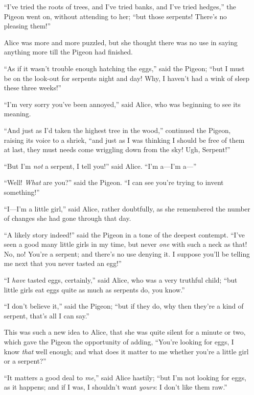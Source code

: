 \documentclass[11pt,openany,oneside]{book}
\begin{document}
“I’ve tried the roots of trees, and I’ve tried banks, and I’ve tried hedges,” the Pigeon went on, without attending to her; “but those serpents! There’s no pleasing them!” 

Alice was more and more puzzled, but she thought there was no use in saying anything more till the Pigeon had finished. 

“As if it wasn’t trouble enough hatching the eggs,” said the Pigeon; “but I must be on the look-out for serpents night and day! Why, I haven’t had a wink of sleep these three weeks!” 

“I’m very sorry you’ve been annoyed,” said Alice, who was beginning to see its meaning. 

“And just as I’d taken the highest tree in the wood,” continued the Pigeon, raising its voice to a shriek, “and just as I was thinking I should be free of them at last, they must needs come wriggling down from the sky! Ugh, Serpent!” 

“But I’m {\em not\/} a serpent, I tell you!” said Alice. “I’m a—I’m a—” 

“Well! {\em What\/} are you?” said the Pigeon. “I can see you’re trying to invent something!” 

“I—I’m a little girl,” said Alice, rather doubtfully, as she remembered the number of changes she had gone through that day. 

“A likely story indeed!” said the Pigeon in a tone of the deepest contempt. “I’ve seen a good many little girls in my time, but never {\em one\/} with such a neck as that! No, no! You’re a serpent; and there’s no use denying it. I suppose you’ll be telling me next that you never tasted an egg!” 

“I {\em have\/} tasted eggs, certainly,” said Alice, who was a very truthful child; “but little girls eat eggs quite as much as serpents do, you know.” 

“I don’t believe it,” said the Pigeon; “but if they do, why then they’re a kind of serpent, that’s all I can say.” 

This was such a new idea to Alice, that she was quite silent for a minute or two, which gave the Pigeon the opportunity of adding, “You’re looking for eggs, I know {\em that\/} well enough; and what does it matter to me whether you’re a little girl or a serpent?” 

“It matters a good deal to {\em me\/},” said Alice hastily; “but I’m not looking for eggs, as it happens; and if I was, I shouldn’t want {\em yours\/}: I don’t like them raw.” 
\end{document}
